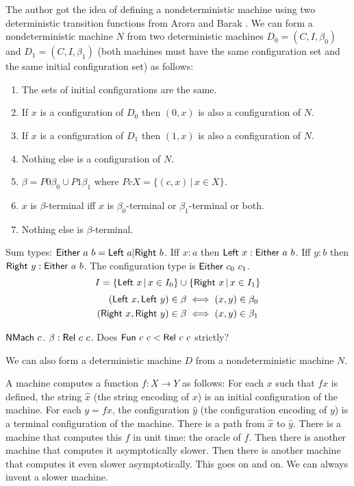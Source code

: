 The author got the idea of defining a nondeterministic machine
using two deterministic transition functions
from Arora and Barak \cite[p.~40]{Arora2009}.
We can form a nondeterministic machine $N$
from two deterministic machines $D_0 = (C,I,\beta_0)$ and $D_1 = (C,I,\beta_1)$
(both machines must have the same configuration set and the same initial configuration set)
as follows:
\begin{enumerate}
    \item The sets of initial configurations are the same.
    \item If $x$ is a configuration of $D_0$ then $(0,x)$ is also a configuration of $N$.
    \item If $x$ is a configuration of $D_1$ then $(1,x)$ is also a configuration of $N$.
    \item Nothing else is a configuration of $N$.
    \item $\beta = P 0 \beta_0 \cup P 1 \beta_1$ where $P c X = \{ (c,x) \,|\, x \in X \}$.
    \item $x$ is $\beta$-terminal iff $x$ is $\beta_0$-terminal or $\beta_1$-terminal or both.
    \item Nothing else is $\beta$-terminal.
\end{enumerate}

Sum types: $\mathsf{Either}~a~b = \mathsf{Left}~a | \mathsf{Right}~b$.
Iff $x : a$ then $\mathsf{Left}~x : \mathsf{Either}~a~b$.
Iff $y : b$ then $\mathsf{Right}~y : \mathsf{Either}~a~b$.
The configuration type is $\mathsf{Either}~c_0~c_1$.
\[
    I =
    \{ \mathsf{Left}~x \,|\, x \in I_0 \}
    \cup
    \{ \mathsf{Right}~x \,|\, x \in I_1 \}
\]
\begin{align*}
    (\mathsf{Left}~x, \mathsf{Left}~y) \in \beta \iff (x,y) \in \beta_0
    \\
    (\mathsf{Right}~x, \mathsf{Right}~y) \in \beta \iff (x,y) \in \beta_1
\end{align*}

$\mathsf{NMach}~c$.
$\beta : \mathsf{Rel}~c~c$.
Does $\mathsf{Fun}~c~c < \mathsf{Rel}~c~c$ strictly?

We can also form a deterministic machine $D$ from a nondeterministic machine $N$.

A machine computes a function $f : X \to Y$ as follows:
For each $x$ such that $f x$ is defined, the string $\hat x$ (the string encoding of $x$)
is an initial configuration of the machine.
For each $y = fx$, the configuration $\hat y$ (the configuration encoding of $y$)
is a terminal configuration of the machine.
There is a path from $\hat x$ to $\hat y$.
There is a machine that computes this $f$ in unit time: the oracle of $f$.
Then there is another machine that computes it asymptotically slower.
Then there is another machine that computes it even slower asymptotically.
This goes on and on.
We can always invent a slower machine.

